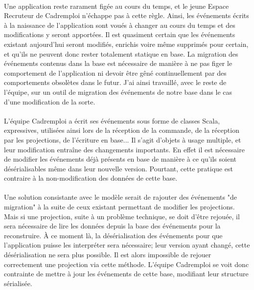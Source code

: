 \paragraph{}
Une application reste rarament figée au cours du temps, et le jeune Espace Recruteur de Cadremploi n'échappe pas à cette règle.
Ainsi, les événements écrits à la naissance de l'application sont voués à changer au cours du temps et des modifications y seront apportées.
Il est quasiment certain que les événements existant aujourd'hui seront modifiés, enrichis voire même supprimés pour certain, et qu'ils ne peuvent donc rester totalement statique en base.
La migration des événements contenus dans la base est nécessaire de manière à ne pas figer le comportement de l'application ni devoir être gêné continuellement par des comportements obsolètes dans le futur.
J'ai ainsi travaillé, avec le reste de l'équipe, sur un outil de migration des événements de notre base dans le cas d'une modification de la sorte.

\paragraph{}
L'équipe Cadremploi a écrit ses événements sous forme de classes Scala, expressives, utilisées ainsi lors de la réception de la commande, de la réception par les projections, de l'écriture en base...
Il s'agit d'objets à usage multiple, et leur modification entraîne des changements importants.
En effet il est nécessaire de modifier les événements déjà présents en base de manière à ce qu'ils soient désérialisables même dans leur nouvelle version.
Pourtant, cette pratique est contraire à la non-modification des données de cette base.
\paragraph{}
Une solution consistante avec le modèle serait de rajouter des événements "de migration" à la suite de ceux existant permettant de modifier les projections.
Mais si une projection, suite à un problème technique, se doit d'être rejouée, il sera nécessaire de lire les données depuis la base des événements pour la reconstruire.
À ce moment là, la désérialisation des événements pour que l'application puisse les interpréter sera nécessaire; leur version ayant changé, cette désérialisation ne sera plus possible.
Il est alors impossible de rejouer correctement une projection via cette méthode.
L'équipe Cadremploi se voit donc contrainte de mettre à jour les événements de cette base, modifiant leur structure sérialisée.
